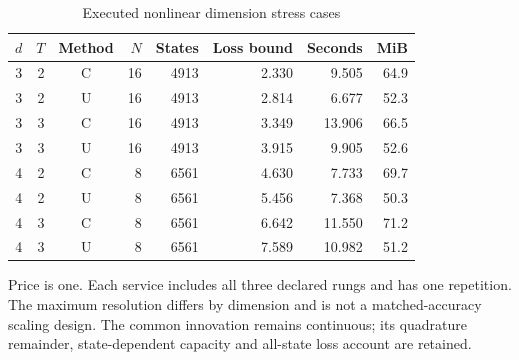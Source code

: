 \begin{table}[htbp]
\centering
\caption{Executed nonlinear dimension stress cases}\label{tab:dimension48}
\footnotesize
\begin{tabular}{rrcrrrrr}
\toprule
$d$ & $T$ & Method & $N$ & States & Loss bound & Seconds & MiB\\
\midrule
3 & 2 & C & 16 & 4913 & 2.330 & 9.505 & 64.9 \\
3 & 2 & U & 16 & 4913 & 2.814 & 6.677 & 52.3 \\
3 & 3 & C & 16 & 4913 & 3.349 & 13.906 & 66.5 \\
3 & 3 & U & 16 & 4913 & 3.915 & 9.905 & 52.6 \\
4 & 2 & C & 8 & 6561 & 4.630 & 7.733 & 69.7 \\
4 & 2 & U & 8 & 6561 & 5.456 & 7.368 & 50.3 \\
4 & 3 & C & 8 & 6561 & 6.642 & 11.550 & 71.2 \\
4 & 3 & U & 8 & 6561 & 7.589 & 10.982 & 51.2 \\
\bottomrule
\end{tabular}
\begin{minipage}{0.97\linewidth}\footnotesize\vspace{3pt}
Price is one. Each service includes all three declared rungs and has one repetition. The maximum resolution differs by dimension and is not a matched-accuracy scaling design. The common innovation remains continuous; its quadrature remainder, state-dependent capacity and all-state loss account are retained.
\end{minipage}
\end{table}
